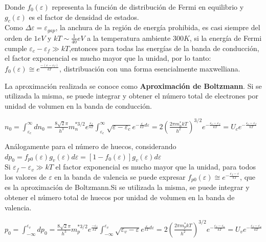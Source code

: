 \documentclass[oneside]{book}
\numberwithin{equation}{section}
\numberwithin{figure}{section}
\numberwithin{table}{section}
\begin{document}
			Donde $f_0(\varepsilon)$ representa la función de distribución de Fermi en equilibrio y $g_c(\varepsilon)$ es el factor de densidad de estados.\\
			
			Como $\Delta \varepsilon=\varepsilon_{gap}$, la anchura de la región de energía prohibida, es casi siempre del orden de $1eV$ y $kT\sim\frac{1}{40}eV$ a la temperatura ambiente $300K$, si la energía de Fermi cumple $\varepsilon_c-\varepsilon_f\gg kT$,entonces para todas las energías de la banda de conducción, el factor exponencial es mucho mayor que la unidad, por lo tanto: $\displaystyle f_0(\varepsilon)\cong e^{\frac{-(\varepsilon-\varepsilon_f)}{kT}}$, distribuación con una forma esencialmente maxwelliana.
			
			La aproximación realizada se conoce como \textbf{Aproximación de Boltzmann}. Si se utilizada la misma, se puede integrar y obtener el número total de electrones por unidad de volumen en la banda de conducción.\\
			
			\begin{center}
			$\displaystyle n_0=\int_{\varepsilon_c}^{\infty}dn_0=\frac{8\sqrt{2}\pi}{h^3}m_n^{*3/2}e^{\frac{\varepsilon_f}{kT}}\int_{\varepsilon_c}^{\infty}\sqrt{\varepsilon-\varepsilon_c}e^{-\frac{\varepsilon}{kT}d\varepsilon}=2\left(\frac{2\pi m_n^* kT}{h^2}\right)^{3/2}e^{-\frac{\varepsilon_c-\varepsilon_f}{kT}}=U_ce^{-\frac{\varepsilon_c-\varepsilon_f}{kT}}$\\
			\end{center}
			
			Análogamente para el número de huecos, considerando $dp_0=f_{p0}(\varepsilon)g_v(\varepsilon)d\varepsilon=[1-f_0(\varepsilon)]g_v(\varepsilon)d\varepsilon$\\
			
			Si $\varepsilon_f-\varepsilon_v\gg kT$ el factor exponencial es mucho mayor que la unidad, para todos los valores de $\varepsilon$ en la banda de valencia se puede expresar $\displaystyle f_{p0}(\varepsilon) \cong e^{-\frac{\varepsilon_f-\varepsilon}{kT}}$, que es la aproximación de Boltzmann.Si se utilizada la misma, se puede integrar y obtener el número total de huecos por unidad de volumen en la banda de valencia.\\
			
			\begin{center}
				$\displaystyle p_0=\int_{-\infty}^{\varepsilon_v}dp_0=\frac{8\sqrt{2}\pi}{h^3}m_p^{*3/2}e^{\frac{-\varepsilon_f}{kT}}\int_{-\infty}^{\varepsilon_v}\sqrt{\varepsilon_v-\varepsilon}e^{\frac{\varepsilon}{kT}d\varepsilon}=2\left(\frac{2\pi m_p^* kT}{h^2}\right)^{3/2}e^{-\frac{\varepsilon_f-\varepsilon_v}{kT}}=U_ve^{-\frac{\varepsilon_f-\varepsilon_v}{kT}}$\\
			\end{center}
			
\end{document}
